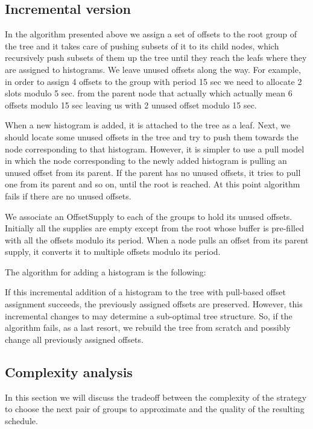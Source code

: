 \subsection*{Incremental version}

In the algorithm presented above we assign a set of offsets to the root group of the tree and it takes care of pushing subsets of it to its child nodes, which recursively push subsets of them up the tree until they reach the leafs where they are assigned to histograms. We leave unused offsets along the way. For example, in order to assign 4 offsets to the group with period 15 sec we need to allocate 2 slots modulo 5 sec. from the parent node that actually which actually mean 6 offsets modulo 15 sec leaving us with 2 unused offset modulo 15 sec.

When a new histogram is added, it is attached to the tree as a leaf. Next, we should locate some unused offsets in the tree and try to push them towards the node corresponding to that histogram. However, it is simpler to use a pull model in which the node corresponding to the newly added histogram is pulling an unused offset from its parent. If the parent has no unused offsets, it tries to pull one from its parent and so on, until the root is reached. At this point algorithm fails if there are no unused offsets.

We associate an OffsetSupply to each of the groups to hold its unused offsets. Initially all the supplies are empty except from the root whose buffer is pre-filled with all the offsets modulo its period. When a node pulls an offset from its parent supply, it converts it to multiple offsets modulo its period.

The algorithm for adding a histogram is the following:

If this incremental addition of a histogram to the tree with pull-based offset assignment succeeds, the previously assigned offsets are preserved. However, this incremental changes to may determine a sub-optimal tree structure. So, if the algorithm fails, as a last resort, we rebuild the tree from scratch and possibly change all previously assigned offsets.

\subsection*{Complexity analysis}

In this section we will discuss the tradeoff between the complexity of the strategy to choose the next pair of groups to approximate and the quality of the resulting schedule.

